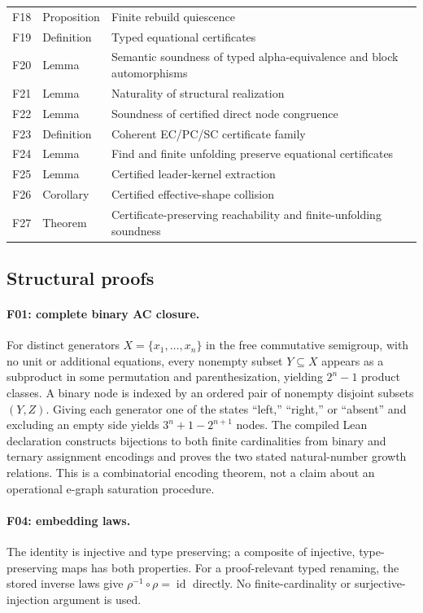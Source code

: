 \begin{longtable}{@{}p{0.8cm}p{2.0cm}p{7.7cm}@{}}
F18 & Proposition & Finite rebuild quiescence\\
F19 & Definition & Typed equational certificates\\
F20 & Lemma & Semantic soundness of typed alpha-equivalence and block automorphisms\\
F21 & Lemma & Naturality of structural realization\\
F22 & Lemma & Soundness of certified direct node congruence\\
F23 & Definition & Coherent EC/PC/SC certificate family\\
F24 & Lemma & Find and finite unfolding preserve equational certificates\\
F25 & Lemma & Certified leader-kernel extraction\\
F26 & Corollary & Certified effective-shape collision\\
F27 & Theorem & Certificate-preserving reachability and finite-unfolding soundness\\
\bottomrule
\end{longtable}



\subsection{Structural proofs}

\paragraph{F01: complete binary AC closure.}
\label{app:proof-F01}
For distinct generators $X=\{x_1,\ldots,x_n\}$ in the free commutative
semigroup, with no unit or additional equations, every nonempty subset
$Y\subseteq X$ appears as a subproduct in some permutation and
parenthesization, yielding $2^n-1$ product classes.  A binary node is indexed
by an ordered pair of nonempty disjoint subsets $(Y,Z)$.  Giving each
generator one of the states ``left,'' ``right,'' or ``absent'' and excluding
an empty side yields $3^n+1-2^{n+1}$ nodes.  The compiled Lean declaration
constructs bijections to both finite cardinalities from binary and ternary
assignment encodings and proves the two stated natural-number growth
relations.  This is a combinatorial encoding theorem, not a claim about an
operational e-graph saturation procedure.

\paragraph{F04: embedding laws.}
\label{app:proof-F04}
The identity is injective and type preserving; a composite of injective,
type-preserving maps has both properties.  For a proof-relevant typed
renaming, the stored inverse laws give
$\rho^{-1}\circ\rho=\operatorname{id}$ directly.  No finite-cardinality or
surjective-injection argument is used.

